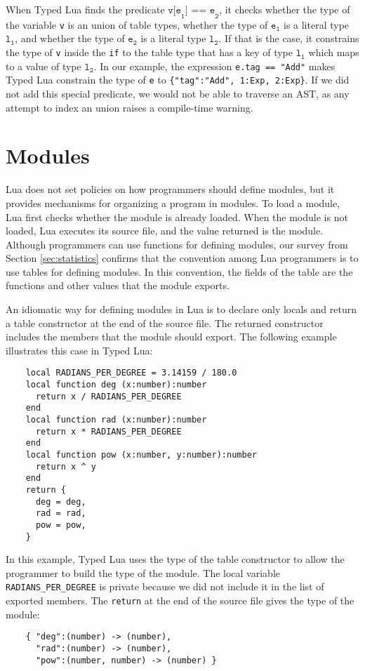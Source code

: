 When Typed Lua finds the predicate $\texttt{v[e}_{\texttt{1}}\texttt{] == e}_{\texttt{2}}$,
it checks whether the type of the variable \texttt{v} is an union of table types,
whether the type of $\texttt{e}_{\texttt{1}}$ is a literal type $\texttt{l}_{\texttt{1}}$,
and whether the type of $\texttt{e}_{\texttt{2}}$ is a literal type $\texttt{l}_{\texttt{2}}$.
If that is the case, it constrains the type of \texttt{v} inside
the \texttt{if} to the table type that has a key of type
$\texttt{l}_{\texttt{1}}$ which maps to a value of type $\texttt{l}_{\texttt{2}}$.
In our example, the expression \texttt{e.tag == "Add"} makes Typed Lua
constrain the type of \texttt{e} to \texttt{\{"tag":"Add", 1:Exp, 2:Exp\}}.
If we did not add this special predicate, we would not be able to traverse an AST,
as any attempt to index an union raises a compile-time warning.

\section{Modules}
\label{sec:modules}

Lua does not set policies on how programmers should define modules,
but it provides mechanisms for organizing a program in modules.
To load a module, Lua first checks whether the module is already loaded.
When the module is not loaded, Lua executes its source file, and
the value returned is the module.
Although programmers can use functions for defining modules,
our survey from Section \ref{sec:statistics} confirms that
the convention among Lua programmers is to use tables for defining modules. 
In this convention, the fields of the table are the functions and other
values that the module exports.

An idiomatic way for defining modules in Lua is to declare only locals
and return a table constructor at the end of the source file.
The returned constructor includes the members that the module should export.
The following example illustrates this case in Typed Lua:
\begin{verbatim}
    local RADIANS_PER_DEGREE = 3.14159 / 180.0
    local function deg (x:number):number
      return x / RADIANS_PER_DEGREE
    end
    local function rad (x:number):number
      return x * RADIANS_PER_DEGREE
    end
    local function pow (x:number, y:number):number
      return x ^ y
    end
    return {
      deg = deg,
      rad = rad,
      pow = pow,
    }
\end{verbatim}

In this example, Typed Lua uses the type of the table constructor
to allow the programmer to build the type of the module.
The local variable \texttt{RADIANS\string_PER\string_DEGREE}
is private because we did not include it in the list of exported members. 
The \texttt{return} at the end of the source file gives the type of the module:
\begin{verbatim}
    { "deg":(number) -> (number),
      "rad":(number) -> (number),
      "pow":(number, number) -> (number) }
\end{verbatim}

